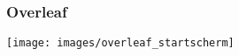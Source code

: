\copyrightTim

\begin{frame}
	\frametitle{Overleaf}
	\texttt{[image: images/overleaf\_startscherm]}
\end{frame}